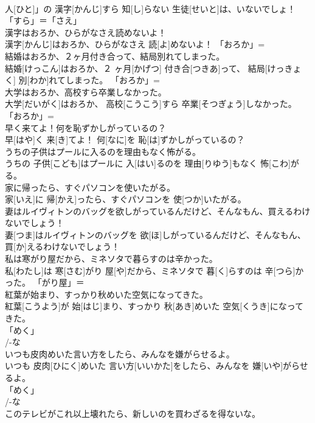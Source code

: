 \documentclass[8pt]{extreport}
\begin{document}
\begin{CJK}{UTF8}{min}
\\	人[ひと]」の 漢字[かんじ]すら 知[し]らない 生徒[せいと]は、いないでしょ！	「すら」＝「さえ」
\\	漢字はおろか、ひらがなさえ読めないよ！	
\\	漢字[かんじ]はおろか、ひらがなさえ 読[よ]めないよ！	「おろか」= 
\\	結婚はおろか、２ヶ月付き合って、結局別れてしまった。	
\\	結婚[けっこん]はおろか、２ ヶ月[かげつ] 付き合[つきあ]って、 結局[けっきょく] 別[わか]れてしまった。	「おろか」= 
\\	大学はおろか、高校すら卒業しなかった。	
\\	大学[だいがく]はおろか、 高校[こうこう]すら 卒業[そつぎょう]しなかった。	「おろか」= 
\\	早く来てよ！何を恥ずかしがっているの？	
\\	早[はや]く 来[き]てよ！ 何[なに]を 恥[は]ずかしがっているの？	
\\	うちの子供はプールに入るのを理由もなく怖がる。	
\\	うちの 子供[こども]はプールに 入[はい]るのを 理由[りゆう]もなく 怖[こわ]がる。	
\\	家に帰ったら、すぐパソコンを使いたがる。	
\\	家[いえ]に 帰[かえ]ったら、すぐパソコンを 使[つか]いたがる。	
\\	妻はルイヴィトンのバッグを欲しがっているんだけど、そんなもん、買えるわけないでしょう！	
\\	妻[つま]はルイヴィトンのバッグを 欲[ほ]しがっているんだけど、そんなもん、 買[か]えるわけないでしょう！	
\\	私は寒がり屋だから、ミネソタで暮らすのは辛かった。	
\\	私[わたし]は 寒[さむ]がり 屋[や]だから、ミネソタで 暮[く]らすのは 辛[つら]かった。	「がり屋」＝ 
\\	紅葉が始まり、すっかり秋めいた空気になってきた。	
\\	紅葉[こうよう]が 始[はじ]まり、すっかり 秋[あき]めいた 空気[くうき]になってきた。	
\\	「めく」
\\	/-な 
\\	いつも皮肉めいた言い方をしたら、みんなを嫌がらせるよ。	
\\	いつも 皮肉[ひにく]めいた 言い方[いいかた]をしたら、みんなを 嫌[いや]がらせるよ。	
\\	「めく」
\\	/-な 
\\	このテレビがこれ以上壊れたら、新しいのを買わざるを得ないな。	

\end{CJK}
\end{document}
